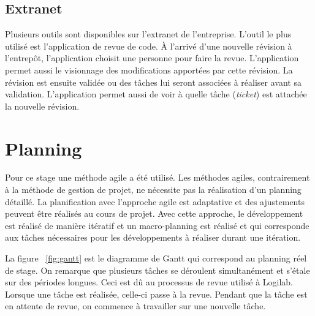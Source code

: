 \subsection{Extranet} 
Plusieurs outils sont disponibles sur l'extranet de l'entreprise. L'outil le 
plus utilisé est l'application de revue de code. \`A l'arrivé d'une nouvelle 
révision à l'entrepôt, l'application choisit une personne pour faire la revue. 
L'application permet aussi le visionnage des modifications apportées par cette 
révision. La révision est ensuite validée ou des tâches lui seront associées 
à réaliser avant sa validation. L'application
permet aussi de voir à quelle tâche (\textit{ticket}) est attachée la nouvelle
révision.   

\section{Planning} 
Pour ce stage une méthode agile a été utilisé. Les méthodes agiles, contrairement 
à la méthode de gestion de projet, ne nécessite pas la réalisation d'un planning 
détaillé. La planification avec l'approche agile est adaptative et des ajustements 
peuvent être réalisés au cours de projet. Avec cette approche, le développement 
est réalisé de manière itératif et un macro-planning est réalisé et qui 
corresponde aux tâches nécessaires pour les développements à réaliser durant 
une itération. 

La figure ~\ref{fig:gantt} est le diagramme de Gantt qui correspond au planning
réel de stage. On remarque que plusieurs tâches se déroulent simultanément et
s'étale sur des périodes longues. Ceci est dû au processus de revue utilisé à
Logilab. Lorsque une tâche est réalisée, celle-ci passe à la revue. Pendant que
la tâche est en attente de revue, on commence à travailler sur une nouvelle
tâche.


